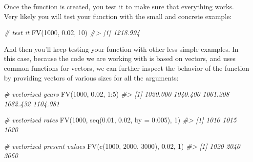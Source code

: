 \documentclass[
]{book}
\newenvironment{Shaded}{\begin{snugshade}}{\end{snugshade}}
\newcommand{\AttributeTok}[1]{\textcolor[rgb]{0.77,0.63,0.00}{#1}}
\newcommand{\CommentTok}[1]{\textcolor[rgb]{0.56,0.35,0.01}{\textit{#1}}}
\newcommand{\DecValTok}[1]{\textcolor[rgb]{0.00,0.00,0.81}{#1}}
\newcommand{\FloatTok}[1]{\textcolor[rgb]{0.00,0.00,0.81}{#1}}
\newcommand{\FunctionTok}[1]{\textcolor[rgb]{0.00,0.00,0.00}{#1}}
\newcommand{\NormalTok}[1]{#1}
\newcommand{\SpecialCharTok}[1]{\textcolor[rgb]{0.00,0.00,0.00}{#1}}
\begin{document}
Once the function is created, you test it to make sure that everything works.
Very likely you will test your function with the small and concrete example:

\begin{Shaded}
\begin{Highlighting}[]
\CommentTok{\# test it}
\FunctionTok{FV}\NormalTok{(}\DecValTok{1000}\NormalTok{, }\FloatTok{0.02}\NormalTok{, }\DecValTok{10}\NormalTok{)}
\CommentTok{\#\textgreater{} [1] 1218.994}
\end{Highlighting}
\end{Shaded}

And then you'll keep testing your function with other less simple examples.
In this case, because the code we are working with is based on vectors,
and uses common functions for vectors, we can further inspect the behavior of
the function by providing vectors of various sizes for all the arguments:

\begin{Shaded}
\begin{Highlighting}[]
\CommentTok{\# vectorized years}
\FunctionTok{FV}\NormalTok{(}\DecValTok{1000}\NormalTok{, }\FloatTok{0.02}\NormalTok{, }\DecValTok{1}\SpecialCharTok{:}\DecValTok{5}\NormalTok{)}
\CommentTok{\#\textgreater{} [1] 1020.000 1040.400 1061.208 1082.432 1104.081}
\end{Highlighting}
\end{Shaded}

\begin{Shaded}
\begin{Highlighting}[]
\CommentTok{\# vectorized rates}
\FunctionTok{FV}\NormalTok{(}\DecValTok{1000}\NormalTok{, }\FunctionTok{seq}\NormalTok{(}\FloatTok{0.01}\NormalTok{, }\FloatTok{0.02}\NormalTok{, }\AttributeTok{by =} \FloatTok{0.005}\NormalTok{), }\DecValTok{1}\NormalTok{)}
\CommentTok{\#\textgreater{} [1] 1010 1015 1020}
\end{Highlighting}
\end{Shaded}

\begin{Shaded}
\begin{Highlighting}[]
\CommentTok{\# vectorized present values}
\FunctionTok{FV}\NormalTok{(}\FunctionTok{c}\NormalTok{(}\DecValTok{1000}\NormalTok{, }\DecValTok{2000}\NormalTok{, }\DecValTok{3000}\NormalTok{), }\FloatTok{0.02}\NormalTok{, }\DecValTok{1}\NormalTok{)}
\CommentTok{\#\textgreater{} [1] 1020 2040 3060}
\end{Highlighting}
\end{Shaded}
\end{document}
